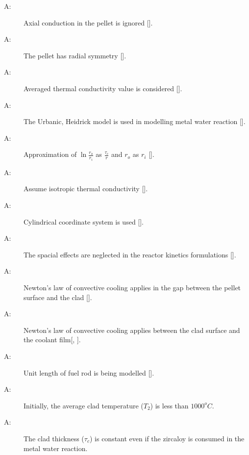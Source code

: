 \begin{description}

\item[A\theassumpnum \label{A_axial}:] Axial
  conduction in the pellet is ignored [].

\item[A\theassumpnum \label{A_radial}:] The pellet has
  radial symmetry [].

\item[A\theassumpnum \label{A_kc}:] Averaged thermal
  conductivity value is considered [].

\item[A\theassumpnum \label{A_heidrick}:] The Urbanic,
  Heidrick model is used in modelling metal water reaction
  [].

\item[A\theassumpnum \label{A_appr}:] Approximation of
  $\ln\frac{r_o}{r_i}$ as $\frac{\tau_c}{ r}$ and $r_o$ as $r_i$
  [].

\item[A\theassumpnum \label{A_isotropic}:] Assume
  isotropic thermal conductivity [].

\item[A\theassumpnum \label{A_coord}:] Cylindrical
  coordinate system is used [].

\item[A\theassumpnum \label{A_stk}:] The spacial
  effects are neglected in the reactor kinetics formulations
  [].

\item[A\theassumpnum \label{A_Newtonfuel}:] Newton's
  law of convective cooling applies in the gap between the pellet surface and
  the clad [].

\item[A\theassumpnum \label{A_Newtonclad}:] Newton's
  law of convective cooling applies between the clad surface and the coolant
  film[, ].

\item[A\theassumpnum \label{A_rodlen}:] Unit length of
  fuel rod is being modelled [].

\item[A\theassumpnum \label{A_it2}:] Initially, the
  average clad temperature ($T_2$) is less than $1000^oC$.

\item[A\theassumpnum \label{A_tauc}:] The clad
  thickness ($\tau_c$) is constant even if the zircaloy is consumed in the metal
  water reaction.

\end{description}

